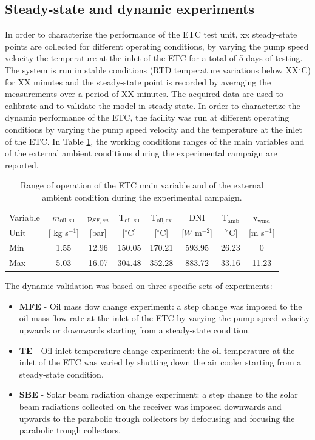 \documentclass[final,3p,times,review]{elsarticle}
\begin{document}
\subsection{Steady-state and dynamic experiments}
%
In order to characterize the performance of the ETC test unit, xx steady-state points are collected for different
operating conditions, by varying the pump speed velocity the temperature at the inlet of the ETC for a total of 5 days of testing. The system is run in stable conditions (RTD temperature variations
below XX$^{\circ}$C) for XX minutes and the steady-state point is recorded by averaging the measurements over a period of XX minutes. The acquired data are used to calibrate and to validate the model in steady-state.
In order to characterize the dynamic performance of the ETC, the facility was run at different operating conditions by varying the pump speed velocity and the temperature at the inlet of the ETC. In Table \ref{Tab:SF_workCond}, the working conditions ranges of the main variables and of the external ambient conditions during the experimental campaign are reported. 
%
\begin{table}[h!]
\centering
\caption{Range of operation of the ETC main variable and of the external ambient condition during the experimental campaign.}
\begin{tabular}{lccccccc}
\toprule
 Variable & $\dot{m}_\mathrm{oil,su}$ & p$_{SF,su}$  &T$_\mathrm{oil,su}$  & T$_\mathrm{oil,ex}$ &  DNI &  T$_\mathrm{amb}$ & v$_\mathrm{wind}$ \\
Unit &  [ kg s$^{-1}$] & [bar] & [$^{\circ}$C] &  [$^{\circ}$C]&  [$W$ m$^{-2}$] &  [$^{\circ}$C] &  [m s$^{-1}$] \\
\toprule
Min & 1.55      &   12.96 & 150.05  &   170.21  &   593.95  &   26.23 &   0  \\
Max & 5.03      &   16.07 & 304.48  &   352.28  &   883.72  &   33.16 &   11.23  \\
\bottomrule
\end{tabular}
\label{Tab:SF_workCond}
\end{table}
%
The dynamic validation was based on three specific sets of experiments:
%
\begin{itemize}
\item \textbf{MFE} - Oil mass flow change experiment: a step change was imposed to the oil mass flow rate at the inlet of the ETC by varying the pump speed velocity upwards or downwards starting from a steady-state condition.
\item \textbf{TE} - Oil inlet temperature change experiment: the oil temperature at the inlet of the ETC was varied by shutting down the air cooler starting from a steady-state condition. 
\item \textbf{SBE} - Solar beam radiation change experiment: a step change to the solar beam radiations  collected on the receiver was imposed downwards and upwards to the parabolic trough collectors by defocusing and focusing the parabolic trough collectors.
\end{itemize} 
%
\end{document}
